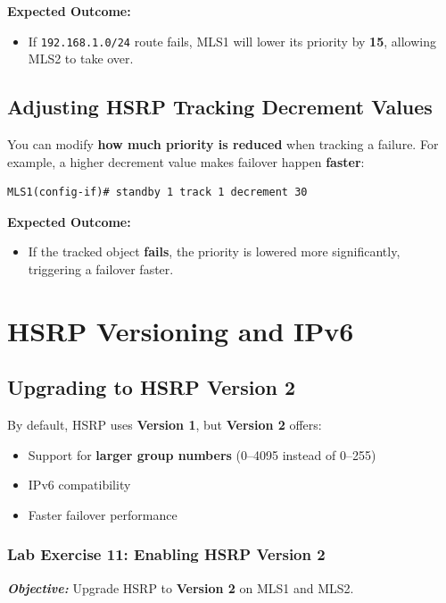 \documentclass[a4paper]{book}
\begin{document}
\textbf{Expected Outcome:}
\begin{itemize}
\item If \texttt{192.168.1.0/24} route fails, MLS1 will lower its priority by \textbf{15}, 
allowing MLS2 to take over.
\end{itemize}

\subsection{Adjusting HSRP Tracking Decrement Values}
You can modify \textbf{how much priority is reduced} when tracking a failure.  
For example, a higher decrement value makes failover happen \textbf{faster}:
\begin{lstlisting}
MLS1(config-if)# standby 1 track 1 decrement 30
\end{lstlisting}

\textbf{Expected Outcome:}
\begin{itemize}
\item If the tracked object \textbf{fails}, the priority is lowered more significantly, 
triggering a failover faster.
\end{itemize}


\vspace{1.5em}

\section{HSRP Versioning and IPv6}

\subsection{Upgrading to HSRP Version 2}
By default, HSRP uses \textbf{Version 1}, but \textbf{Version 2} offers:
\begin{itemize}
\item Support for \textbf{larger group numbers} (0--4095 instead of 0--255)
\item IPv6 compatibility
\item Faster failover performance
\end{itemize}

\subsubsection{Lab Exercise 11: Enabling HSRP Version 2}
\textbf{\textit{Objective:}} Upgrade HSRP to \textbf{Version 2} on MLS1 and MLS2.
\end{document}
